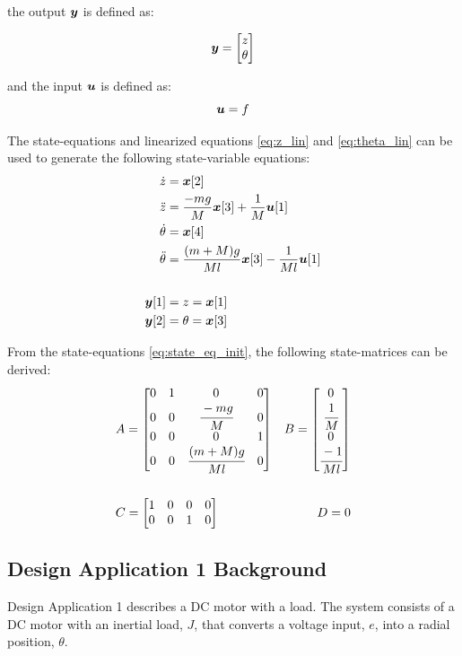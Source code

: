 \documentclass[]{article}
\begin{document}
		the output $\vb*{y}$ is defined as:
		
		\begin{equation}
			\vb*{y} = \mqty[z \\ \theta]
		\end{equation}
		
		and the input $\vb*{u}$ is defined as:
		\begin{equation}
			\vb*{u} = f
		\end{equation}
		
		The state-equations and  linearized equations \eqref{eq:z_lin} and \eqref{eq:theta_lin} can be used to generate the following state-variable equations:
		\begin{equation}
			\begin{aligned}
				\dot{z} &= \vb*{x}[2]\\
				\ddot{z} & = \frac{-mg}{M}\vb*{x}[3] + \frac{1}{M} \vb*{u}[1]\\
				\dot{\theta} & = \vb*{x}[4]\\
				\ddot{\theta} & = \frac{(m+M)g}{Ml}\vb*{x}[3] - \frac{1}{Ml} \vb*{u}[1]\\
				\\
				\vb*{y}[1] &= z = \vb*{x}[1]\\
				\vb*{y}[2] &= \theta = \vb*{x}[3]
			\end{aligned}
			\label{eq:state_eq_init}
		\end{equation}
		
		From the state-equations \eqref{eq:state_eq_init}, the following state-matrices can be derived:
		\begin{equation}
			\begin{aligned}
				&A = \mqty[	0 & 1 & 0 & 0\\
							0 & 0 & \cfrac{-mg}{M} & 0\\
							0 & 0 & 0 & 1\\
							0 & 0 & \cfrac{(m+M)g}{Ml}	& 0]
				&B = \mqty[	0\\
							\cfrac{1}{M}\\
							0\\
							\cfrac{-1}{Ml}] \\ \\
				&C = \mqty[	1 & 0 & 0 & 0\\
							0 & 0 & 1 & 0]
				&D = 0
			\end{aligned}
			\label{eq:state_matrices}
		\end{equation}
	
	\subsection{Design Application 1 Background}
		Design Application 1 describes a DC motor with a load. The system consists of a DC motor with an inertial load, $J$, that converts a voltage input, $e$, into a radial position, $\theta$.
		
\end{document}
